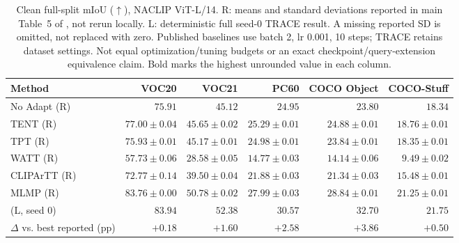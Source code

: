 \begin{table}[t]
\caption{Clean full-split mIoU ($\uparrow$), NACLIP ViT-L/14. R: means and standard deviations reported in main Table~5 of \citet{noori2025mlmp}, not rerun locally. L: deterministic full seed-0 TRACE result. A missing reported SD is omitted, not replaced with zero. Published baselines use batch 2, lr 0.001, 10 steps; TRACE retains dataset settings. Not equal optimization/tuning budgets or an exact checkpoint/query-extension equivalence claim. Bold marks the highest unrounded value in each column.}
\label{tab:reported}
\centering\small
\begin{tabular}{@{}lrrrrr@{}}
\toprule
Method & VOC20 & VOC21 & PC60 & COCO Object & COCO-Stuff \\
\midrule
No Adapt (R) & $75.91$ & $45.12$ & $24.95$ & $23.80$ & $18.34$ \\
TENT (R) & $77.00\pm0.04$ & $45.65\pm0.02$ & $25.29\pm0.01$ & $24.88\pm0.01$ & $18.76\pm0.01$ \\
TPT (R) & $75.93\pm0.01$ & $45.17\pm0.01$ & $24.98\pm0.01$ & $23.84\pm0.01$ & $18.35\pm0.01$ \\
WATT (R) & $57.73\pm0.06$ & $28.58\pm0.05$ & $14.77\pm0.03$ & $14.14\pm0.06$ & $9.49\pm0.02$ \\
CLIPArTT (R) & $72.77\pm0.14$ & $39.50\pm0.04$ & $21.88\pm0.03$ & $21.34\pm0.03$ & $15.48\pm0.01$ \\
MLMP (R) & $83.76\pm0.00$ & $50.78\pm0.02$ & $27.99\pm0.03$ & $28.84\pm0.01$ & $21.25\pm0.01$ \\
\midrule
\method{} (L, seed 0) & $\mathbf{83.94}$ & $\mathbf{52.38}$ & $\mathbf{30.57}$ & $\mathbf{32.70}$ & $\mathbf{21.75}$ \\
$\Delta$ vs. best reported (pp) & $+0.18$ & $+1.60$ & $+2.58$ & $+3.86$ & $+0.50$ \\
\bottomrule
\end{tabular}
\end{table}
